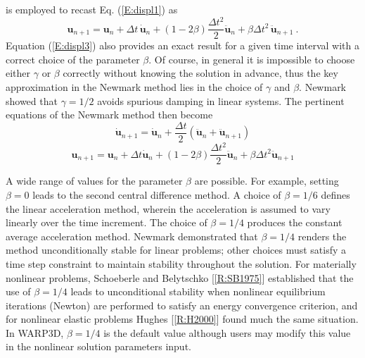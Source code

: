 \documentclass[11pt]{report}
\numberwithin{equation}{section}
\begin{document}
%
\noindent is employed to recast Eq. (\ref{E:displ1}) as
%
\begin{equation}\label{E:displ3}
\bm{u}_{n+1} =\bm{u}_n + \Delta t \, \dot{\bm{u}}_n + \left( 1- 2 \beta \right )
\frac{\Delta t^2}{2}\ddot{\bm{u}}_n + \beta \Delta t ^2\, \ddot{\bm{u}}_{n+1}\ .
\end{equation}
%
Equation (\ref{E:displ3}) also provides an exact result for a given time interval 
with a correct choice of the parameter $\beta$. Of course, 
in general it is impossible to choose either $\gamma$ or $\beta$ correctly without 
knowing the solution in advance, thus the key approximation in the Newmark 
method lies in the choice of $\gamma$ and $\beta$. Newmark showed that  $\gamma=1/2$ 
avoids spurious damping in linear systems. 
The pertinent equations of the Newmark method then become
%
\begin{equation}\label{E:NM1}
\dot{\bm{u}}_{n+1} = \dot{\bm{u}}_n + \frac{\Delta t }{2} 
\left( \ddot{\bm{u}}_n  +\ddot{\bm{u}}_{n+1}  \right )
\end{equation}
%
%
\begin{equation}\label{E:NM2}
\bm{u}_{n+1} = \bm{u}_n + \Delta t \dot{\bm{u}}_n + \left( 1- 2 \beta \right )
\frac{\Delta t ^2}{2} \ddot{\bm{u}}_n + \beta \Delta t ^2 \ddot{\bm{u}}_{n+1} 
\end{equation}
%

A wide range of values for the parameter $\beta$ are possible. For example, setting $\beta=0$
leads to the second central difference method. A choice of $\beta=1/6$ defines the linear 
acceleration method, wherein the acceleration is assumed to vary  linearly over the time increment. 
The choice of $\beta=1/4$ produces the constant average acceleration method. 
Newmark demonstrated that $\beta=1/4$ renders the method unconditionally stable for linear problems; 
other choices must satisfy a time step constraint to maintain stability throughout the solution. For materially nonlinear problems, Schoeberle and Belytschko [\ref{R:SB1975}] established that the use of  $\beta=1/4$ leads to unconditional stability when nonlinear equilibrium iterations (Newton) are performed to satisfy an energy convergence criterion, and for nonlinear elastic problems Hughes [\ref{R:H2000}] found much the same situation. In WARP3D,  $\beta=1/4$ is the default value although users may modify this value in the nonlinear solution parameters input.
\end{document}
